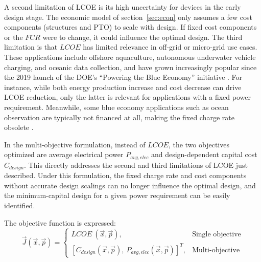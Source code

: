 A second limitation of LCOE is its high uncertainty for devices in the early design stage.
The economic model of section~\ref{sec:econ} only assumes a few cost components (structures and PTO) to scale with design.
If fixed cost components or the $FCR$ were to change, it could influence the optimal design.
The third limitation is that $LCOE$ has limited relevance in off-grid or micro-grid use cases.
These applications include offshore aquaculture, autonomous underwater vehicle charging, and oceanic data collection, and have grown increasingly popular since the 2019 launch of the DOE's ``Powering the Blue Economy'' initiative \cite{livecchi_powering_2019}.
For instance, while both energy production increase and cost decrease can drive LCOE reduction, only the latter is relevant for applications with a fixed power requirement.
Meanwhile, some blue economy applications such as ocean observation are typically not financed at all, making the fixed charge rate obsolete \cite{jenne_powering_2021}. 

In the multi-objective formulation, instead of $LCOE$, the two objectives optimized are average electrical power $P_{avg,elec}$ and design-dependent capital cost $C_{design}$.
This directly addresses the second and third limitations of LCOE just described.
Under this formulation, the fixed charge rate and cost components without accurate design scalings can no longer influence the optimal design, and the minimum-capital design for a given power requirement can be easily identified.

The objective function is expressed:
\begin{equation}
\vec{J}(\vec{x}, \vec{p}) = \begin{cases} LCOE\ (\vec{x}, \vec{p}), & \text{Single objective} \\
[C_{design} (\vec{x}, \vec{p}),\ P_{avg,elec} (\vec{x}, \vec{p})]^T, & \text{Multi-objective}
\end{cases}
\label{obj}
\end{equation}

